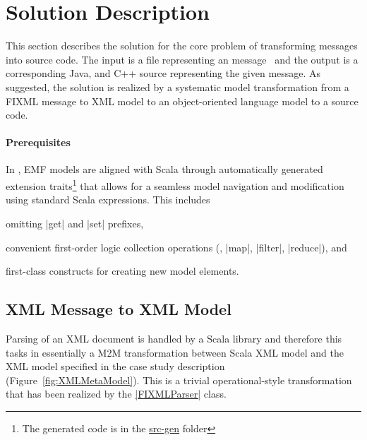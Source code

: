 
\section{Solution Description}
\label{sec:SolutionDescription}

This section describes the solution for the core problem of transforming \FIXML messages into source code.
The input is a file representing an  message~\cite{FIXML2004} and the output is a corresponding Java, \Csharp and C++ source representing the given \FIXML message. 
As suggested, the solution is realized by a systematic model transformation from a FIXML message to XML model to an object-oriented language model to a source code.

\vspace*{-5mm}
\paragraph{Prerequisites}
%
In \SIGMA, EMF models are aligned with Scala through automatically generated extension traits\footnote{The generated code is in the \href{https://github.com/fikovnik/ttc14-fixml-sigma/blob/master/ttc14-fixml-base/src-gen}{src-gen} folder} that allows for a seamless model navigation and modification using standard Scala expressions.
This includes
%
\begin{inparaitem}[]
  \item omitting \Scala|get| and \Scala|set| prefixes,
  \item convenient first-order logic collection operations (\Eg, \Scala|map|, \Scala|filter|, \Scala|reduce|), and
  \item first-class constructs for creating new model elements.
\end{inparaitem}

\subsection{\FIXML XML Message to XML Model}

Parsing of an XML document is handled by a Scala library and therefore this tasks in essentially a M2M transformation between Scala XML model and the XML model specified in the case study description (\Cf Figure~\ref{fig:XMLMetaModel}).
This is a trivial operational-style transformation that has been realized by the \href{https://github.com/fikovnik/ttc14-fixml-sigma/blob/master/ttc14-fixml-base/src/fr/inria/spirals/sigma/ttc14/fixml/FIXMLParser.scala}{\Scala|FIXMLParser|} class.

